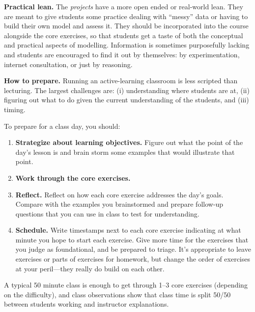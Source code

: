 {\bf Practical lean.} 
The \emph{projects} have a more open ended or real-world lean. They are meant to give students some practice dealing with ``messy'' data or having to build their own model and assess it. They should be incorporated into the course alongside the core exercises, so that students get a taste of both the conceptual and practical aspects of modelling. Information is sometimes purposefully lacking and students are encouraged to find it out by themselves: by experimentation, internet consultation, or just by reasoning. 

{\bf How to prepare.}
Running an active-learning classroom is less scripted than lecturing.
The largest challenges are: (i) understanding where students are at, (ii) figuring out what to do given the current understanding of the students, and (iii) timing.

To prepare for a class day, you should:
\begin{enumerate}
	\item {\bf Strategize about learning objectives.} Figure out what the point of the day's lesson is and brain storm some examples that would illustrate that point.
	\item {\bf Work through the core exercises.} 
	\item {\bf Reflect.} Reflect on how each core exercise addresses the day's goals. Compare with the examples you brainstormed and prepare follow-up questions that you can use in class to test for understanding.
	\item {\bf Schedule.} Write timestamps next to each core exercise indicating at what minute you hope to start each exercise. Give more time for the exercises that you judge as foundational, and be prepared to triage. It's appropriate to leave exercises or parts of exercises for homework, but change the order	of exercises at your peril---they really do build on each other.
\end{enumerate}

A typical 50 minute class is enough to get through 1--3 core exercises (depending on the difficulty), and class observations show that class time is split 50/50 between students working and instructor explanations.

